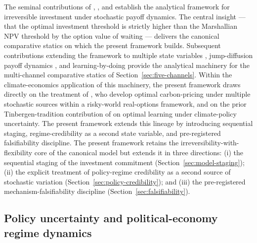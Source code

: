 \documentclass[12pt,a4paper]{article}
\theoremstyle{plain}
\theoremstyle{definition}
\begin{document}
The seminal contributions of \cite{dixit1994investment}, \cite{abel1996options}, and \cite{bertola1994irreversible} establish the analytical framework for irreversible investment under stochastic payoff dynamics. The central insight --- that the optimal investment threshold is strictly higher than the Marshallian NPV threshold by the option value of waiting --- delivers the canonical comparative statics on which the present framework builds. Subsequent contributions extending the framework to multiple state variables \citep{pindyck1988irreversible}, jump-diffusion payoff dynamics \citep{boyarchenko2003perpetual}, and learning-by-doing \citep{majd1987time} provide the analytical machinery for the multi-channel comparative statics of Section~\ref{sec:five-channels}. Within the climate-economics application of this machinery, the present framework draws directly on the treatment of \citet{olijslagers2021carbon}, who develop optimal carbon-pricing under multiple stochastic sources within a risky-world real-options framework, and on the prior Tinbergen-tradition contribution of \citet{vanwijnbergen2012optimal} on optimal learning under climate-policy uncertainty. The present framework extends this lineage by introducing sequential staging, regime-credibility as a second state variable, and pre-registered falsifiability discipline. The present framework retains the irreversibility-with-flexibility core of the canonical model but extends it in three directions: (i) the sequential staging of the investment commitment (Section~\ref{sec:model-staging}); (ii) the explicit treatment of policy-regime credibility as a second source of stochastic variation (Section~\ref{sec:policy-credibility}); and (iii) the pre-registered mechanism-falsifiability discipline (Section~\ref{sec:falsifiability}).

\subsection{Policy uncertainty and political-economy regime dynamics}
\label{sec:lit-policy-uncertainty}
\end{document}
